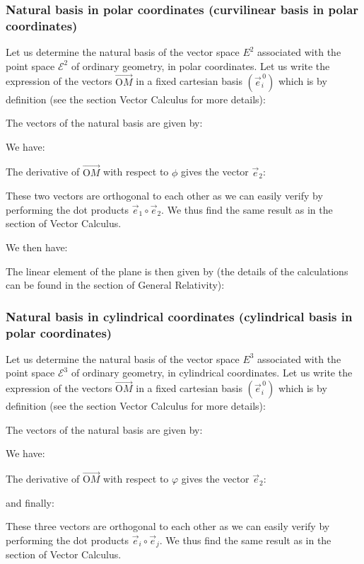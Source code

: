 	
	\subsubsection{Natural basis in polar coordinates (curvilinear basis in polar coordinates)}
	Let us determine the natural basis of the vector space $E^2$ associated with the point space $\mathcal{E}^2$ of ordinary geometry, in polar coordinates. Let us write the expression of the vectors $\overrightarrow{\text{O}M}$ in a fixed cartesian basis $(\vec{e}_i^{\,0})$ which is by definition (see the section Vector Calculus for more details):
	
	The vectors of the natural basis are given by:
	
	We have:
	
	The derivative of $\overrightarrow{\text{O}M}$ with respect to $\phi$ gives the vector $\vec{e}_2$:
	
	These two vectors are orthogonal to each other as we can easily verify by performing the dot products $\vec{e}_1\circ\vec{e}_2$. We thus find the same result as in the section of Vector Calculus.
	
	We then have:
	
	The linear element of the plane is then given by (the details of the calculations can be found in the section of General Relativity):
	
	
	\subsubsection{Natural basis in cylindrical coordinates (cylindrical basis in polar coordinates)}
	Let us determine the natural basis of the vector space $E^3$ associated with the point space $\mathcal{E}^3$ of ordinary geometry, in cylindrical coordinates. Let us write the expression of the vectors $\overrightarrow{\text{O}M}$ in a fixed cartesian basis $(\vec{e}_i^{\,0})$ which is by definition (see the section Vector Calculus for more details):
	
	The vectors of the natural basis are given by:
	
	We have:
	
	The derivative of $\overrightarrow{\text{O}M}$ with respect to $\varphi$ gives the vector $\vec{e}_2$:
	
	and finally:
	
	These three vectors are orthogonal to each other as we can easily verify by performing the dot products $\vec{e}_i\circ\vec{e}_j$. We thus find the same result as in the section of Vector Calculus.
	
